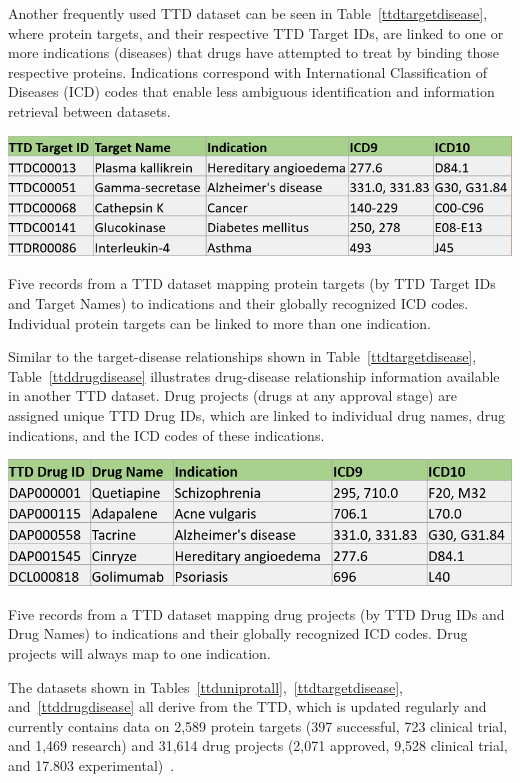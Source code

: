 \documentclass{IEEEtran}
\begin{document}
	
	Another frequently used TTD dataset can be seen in Table~\ref{ttdtargetdisease}, where protein targets, and their respective TTD Target IDs, are linked to one or more indications (diseases) that drugs have attempted to treat by binding those respective proteins.  Indications correspond with International Classification of Diseases (ICD) codes that enable less ambiguous identification and information retrieval between datasets.
		\begin{table}[h]
			\centering
			\includegraphics[width=\linewidth]{ttdtargetdisease}
			\caption{\footnotesize Five records from a TTD dataset mapping protein targets (by TTD Target IDs and Target Names) to indications and their globally recognized ICD codes. Individual protein targets can be linked to more than one indication.}
			\label{ttdtargetdisease}
		\end{table}

	Similar to the target-disease relationships shown in Table~\ref{ttdtargetdisease}, Table~\ref{ttddrugdisease} illustrates drug-disease relationship information available in another TTD dataset.  Drug projects (drugs at any approval stage) are assigned unique TTD Drug IDs, which are linked to individual drug names, drug indications, and the ICD codes of these indications.  
	\begin{table}[h]
		\centering
		\includegraphics[width=\linewidth]{ttddrugdisease}
		\caption{\footnotesize Five records from a TTD dataset mapping drug projects (by TTD Drug IDs and Drug Names) to indications and their globally recognized ICD codes.  Drug projects will always map to one indication.}
		\label{ttddrugdisease}
	\end{table}	
	
	The datasets shown in Tables~\ref{ttduniprotall},~\ref{ttdtargetdisease}, and~\ref{ttddrugdisease} all derive from the TTD, which is updated regularly and currently contains data on 2,589 protein targets (397 successful, 723 clinical trial, and 1,469 research) and 31,614 drug projects (2,071 approved, 9,528 clinical trial, and 17.803 experimental)~\cite{ttd16}.
\end{document}
